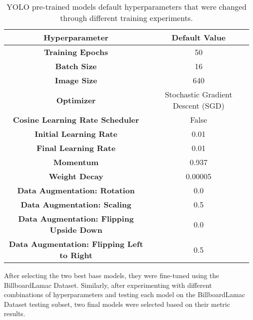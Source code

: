 \begin{table}[!h]
\centering
\renewcommand{\arraystretch}{1.3} %
\begin{tabular}{|c|c|}
\hline
\textbf{Hyperparameter} & \textbf{Default Value} \\ \hline
\textbf{Training Epochs} & 50 \\ \hline
\textbf{Batch Size} & 16  \\ \hline
\textbf{Image Size} & 640  \\ \hline
\textbf{Optimizer} & Stochastic Gradient Descent (SGD)  \\ \hline
\textbf{Cosine Learning Rate Scheduler} & False \\ \hline
\textbf{Initial Learning Rate} & 0.01 \\ \hline
\textbf{Final Learning Rate} & 0.01 \\ \hline
\textbf{Momentum} & 0.937 \\ \hline
\textbf{Weight Decay} & 0.00005 \\ \hline
\textbf{Data Augmentation: Rotation} & 0.0 \\ \hline
\textbf{Data Augmentation: Scaling} & 0.5 \\ \hline
\textbf{Data Augmentation: Flipping Upside Down} & 0.0 \\ \hline
\textbf{Data Augmentation: Flipping Left to Right} & 0.5 \\ \hline
\end{tabular}
\caption{YOLO pre-trained models default hyperparameters that were changed through different training experiments.}
\label{tab:defaulthyperparameters}
\end{table}

After selecting the two best base models, they were fine-tuned using the BillboardLamac Dataset. Similarly, after experimenting with different combinations of hyperparameters and testing each model on the BillboardLamac Dataset testing subset, two final models were selected based on their metric results.

